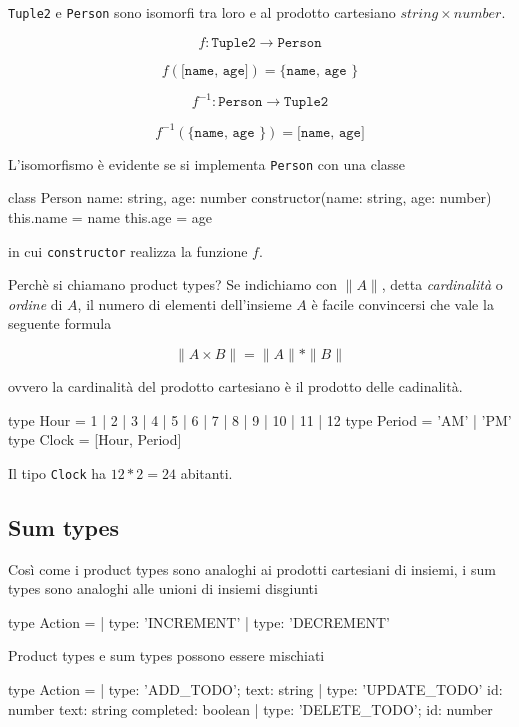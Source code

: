\documentclass[12pt]{article}
\theoremstyle{definition}
\newenvironment{code}
  {\vspace{0.5cm} \VerbatimEnvironment\begin{typescriptcode}}
  {\end{typescriptcode} \vspace{0.2cm}}
\begin{document}
\texttt{Tuple2} e \texttt{Person} sono isomorfi tra loro e al prodotto cartesiano $string \times number$.

$$
f: \texttt{Tuple2} \rightarrow \texttt{Person}
$$

$$
f(\texttt{[name, age]}) = \texttt{\{ name, age  \}}
$$

$$
f^{-1}: \texttt{Person} \rightarrow \texttt{Tuple2}
$$

$$
f^{-1}(\texttt{\{ name, age  \}}) = \texttt{[name, age]}
$$

L'isomorfismo è evidente se si implementa \texttt{Person} con una classe

\begin{code}
class Person {
  name: string,
  age: number
  constructor(name: string, age: number) {
    this.name = name
    this.age = age
  }
}
\end{code}

in cui \texttt{constructor} realizza la funzione $f$.

Perchè si chiamano product types? Se indichiamo con $\|A\|$, detta \emph{cardinalità} o \emph{ordine} di $A$, il numero di elementi
dell'insieme $A$ è facile convincersi che vale la seguente formula

$$
\|A \times B\| = \|A\| * \|B\|
$$

ovvero la cardinalità del prodotto cartesiano è il prodotto delle cadinalità.

\begin{code}
type Hour = 1 | 2 | 3 | 4 | 5 | 6 | 7 | 8 | 9 | 10 | 11 | 12
type Period = 'AM' | 'PM'
type Clock = [Hour, Period]
\end{code}

Il tipo \texttt{Clock} ha $12 * 2 = 24$ abitanti.

\subsection{Sum types}

Così come i product types sono analoghi ai prodotti cartesiani di insiemi, i sum types sono analoghi alle unioni di insiemi disgiunti

\begin{code}
type Action =
  | { type: 'INCREMENT' }
  | { type: 'DECREMENT' }
\end{code}

Product types e sum types possono essere mischiati

\begin{code}
type Action =
  | { type: 'ADD_TODO'; text: string }
  | {
      type: 'UPDATE_TODO'
      id: number
      text: string
      completed: boolean
    }
  | { type: 'DELETE_TODO'; id: number }
\end{code}
\end{document}
